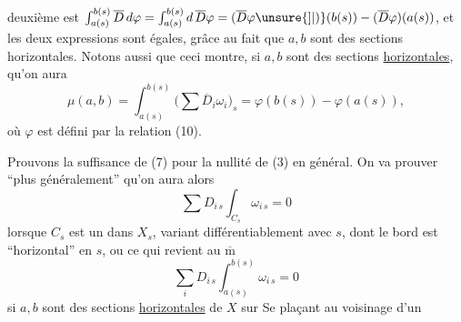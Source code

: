 deuxième est $\int_{a(s)}^{b(s)}\overline D\,d\varphi
=\int_{a(s)}^{b(s)}d\,\overline D\varphi
=(\overline D\varphi\unsure{]|)}(b(s))-(\overline D\varphi)(a(s))$,
 et les deux expressions sont égales, grâce au fait que $a,b$ sont des sections horizontales. Notons aussi que ceci montre, si $a,b$ sont des sections \uline{horizontales}, qu'on aura
\[
 \mu(a,b)=\int_{a(s)}^{b(s)}\bigl(\sum\overline D_i\omega_i\bigr)_s
 =\varphi(b(s))-\varphi(a(s)),\tag*{(14)}
\]
où $\varphi$ est défini par la relation (10).

Prouvons la suffisance de (7) pour la nullité de (3) en général. On va prouver ``plus généralement'' qu'on aura alors
\[
 \sum D_{i\,s}\int_{C_s}\omega_{i\,s}=0
\]
lorsque $C_s$ est un  dans $X_s$, variant différentiablement avec $s$, dont le bord est ``horizontal'' en $s$, ou ce qui revient au $\overline{\mathrm m}$
\[
 \sum_i D_{i\,s}\int_{a(s)}^{b(s)}\omega_{i\,s}=0
\]
si $a,b$ sont des sections \uline{horizontales} de $X$ sur    Se plaçant au voisinage d'un
